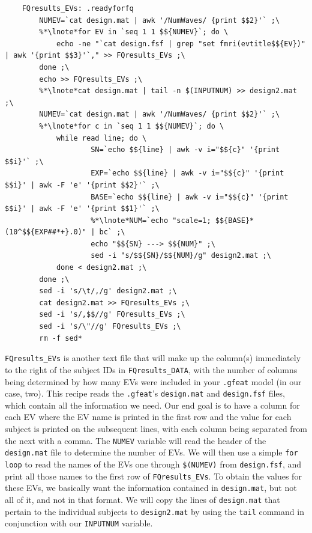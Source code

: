 \begin{lstlisting}
	FQresults_EVs: .readyforfq
		NUMEV=`cat design.mat | awk '/NumWaves/ {print $$2}'` ;\
		%*\lnote*for EV in `seq 1 1 $${NUMEV}`; do \
			echo -ne "`cat design.fsf | grep "set fmri(evtitle$${EV})" | awk '{print $$3}'`," >> FQresults_EVs ;\
		done ;\
		echo >> FQresults_EVs ;\
		%*\lnote*cat design.mat | tail -n $(INPUTNUM) >> design2.mat ;\
		NUMEV=`cat design.mat | awk '/NumWaves/ {print $$2}'` ;\
		%*\lnote*for c in `seq 1 1 $${NUMEV}`; do \
		 	while read line; do \
					SN=`echo $${line} | awk -v i="$${c}" '{print $$i}'` ;\
					EXP=`echo $${line} | awk -v i="$${c}" '{print $$i}' | awk -F 'e' '{print $$2}'` ;\
					BASE=`echo $${line} | awk -v i="$${c}" '{print $$i}' | awk -F 'e' '{print $$1}'` ;\
					%*\lnote*NUM=`echo "scale=1; $${BASE}*(10^$${EXP##*+}.0)" | bc` ;\
					echo "$${SN} ---> $${NUM}" ;\
					sed -i "s/$${SN}/$${NUM}/g" design2.mat ;\
			done < design2.mat ;\
		done ;\
		sed -i 's/\t/,/g' design2.mat ;\
		cat design2.mat >> FQresults_EVs ;\
		sed -i 's/,$$//g' FQresults_EVs ;\
		sed -i 's/\"//g' FQresults_EVs ;\
		rm -f sed*
\end{lstlisting}
\texttt{FQresults_EVs} is another text file that will make up the column(s) immediately to the right of the subject IDs in \texttt{FQresults_DATA}, with the number of columns being determined by how many EVs were included in your \texttt{.gfeat} model (in our case, two). This recipe reads the \texttt{.gfeat}'s \texttt{design.mat} and \texttt{design.fsf} files, which contain all the information we need. Our end goal is to have a column for each EV where the EV name is printed in the first row and the value for each subject is printed on the subsequent lines, with each column being separated from the next with a comma. The \texttt{NUMEV} variable will read the header of the \texttt{design.mat} file to determine the number of EVs.  We will then use a simple \texttt{for loop} to read the names of the EVs one through \texttt{\$(NUMEV)} from \texttt{design.fsf}, and print all those names to the first row of \texttt{FQresults_EVs}. To obtain the values for these EVs, we basically want the information contained in \texttt{design.mat}, but not all of it, and not in that format. We will copy the lines of \texttt{design.mat} that pertain to the individual subjects to \texttt{design2.mat} by using the \texttt{tail} command in conjunction with our \texttt{INPUTNUM} variable. 

